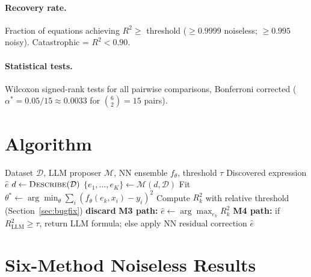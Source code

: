 \documentclass[twoside,11pt]{article}
\newcommand{\Rsq}{R^{2}}
\begin{document}
\paragraph{Recovery rate.}
Fraction of equations achieving $\Rsq \geq $ threshold ($\geq 0.9999$
noiseless; $\geq 0.995$ noisy).  Catastrophic = $\Rsq < 0.90$.

\paragraph{Statistical tests.}
Wilcoxon signed-rank tests for all pairwise comparisons, Bonferroni corrected
($\alpha^* = 0.05/15 \approx 0.0033$ for $\binom{6}{2}=15$ pairs).

\section{Algorithm}
\label{sec:algorithm}

\begin{algorithm}[ht]
\caption{HypatiaX hybrid symbolic discovery (M3/M4 core loop)}
\label{alg:hds}
\begin{algorithmic}[1]
\REQUIRE Dataset $\mathcal{D}$, LLM proposer $\mathcal{M}$,
         NN ensemble $f_\theta$, threshold $\tau$
\ENSURE  Discovered expression $\hat{e}$
\STATE $d \leftarrow \textsc{Describe}(\mathcal{D})$
\STATE $\{e_1,\dots,e_K\} \leftarrow \mathcal{M}(d, \mathcal{D})$
  \STATE Fit $\theta^* \leftarrow \arg\min_\theta \sum_i (f_\theta(e_k,x_i)-y_i)^2$
  \STATE Compute $\Rsq_k$ with relative threshold (Section~\ref{sec:bugfix})
    \STATE \textbf{discard}
  \ENDIF
\ENDFOR
\STATE \textbf{M3 path:} $\hat{e} \leftarrow \arg\max_{e_k} \Rsq_k$
\STATE \textbf{M4 path:} if $\Rsq_{\text{LLM}} \geq \tau$, return LLM formula;
       else apply NN residual correction
\RETURN $\hat{e}$
\end{algorithmic}
\end{algorithm}

\section{Six-Method Noiseless Results}
\label{sec:noiseless}
\end{document}
